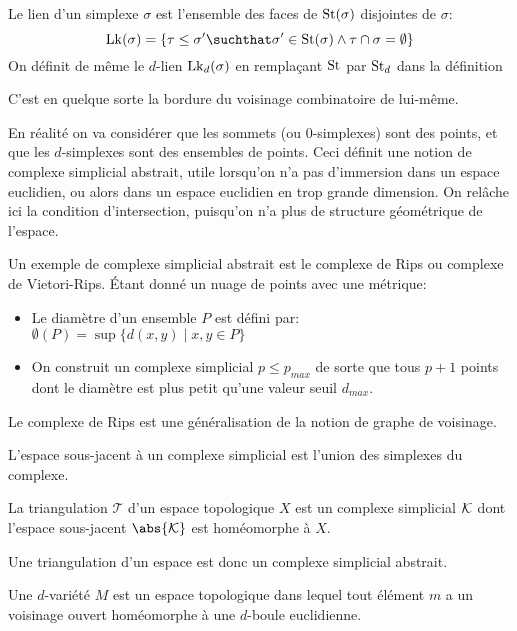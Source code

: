 \begin{definition}
	Le lien d'un simplexe $\sigma$ est l'ensemble des faces de $\operatorname{St}(\sigma)$ disjointes de $\sigma$:
	\begin{equation*}
		\Lk(\sigma) = \left\{\tau \leq \sigma' \suchthat \sigma' \in \St(\sigma) \land \tau \cap \sigma = \emptyset \right\}
	\end{equation*}
	On définit de même le $d$-lien $\operatorname{Lk}_{d}(\sigma)$ en remplaçant $\operatorname{St}$ par $\operatorname{St}_{d}$ dans la définition
\end{definition}
C'est en quelque sorte la bordure du voisinage combinatoire de lui-même.

\medskip

En réalité on va considérer que les sommets (ou $0$-simplexes) sont des points, et que les $d$-simplexes sont des ensembles de points.
Ceci définit une notion de complexe simplicial abstrait, utile lorsqu'on n'a pas d'immersion dans un espace euclidien, ou alors dans un espace euclidien en trop grande dimension.
On relâche ici la condition d'intersection, puisqu'on n'a plus de structure géométrique de l'espace.

Un exemple de complexe simplicial abstrait est le complexe de Rips ou complexe de Vietori-Rips. Étant donné un nuage de points avec une métrique:
\begin{itemize}
	\item Le diamètre d'un ensemble $P$ est défini par: $\emptyset(P) = \sup\{d(x, y) \mid x, y \in P\}$
	\item On construit un complexe simplicial $p \leq p_{max}$ de sorte que tous $p + 1$ points dont le diamètre est plus petit qu'une valeur seuil $d_{max}$.
\end{itemize}
Le complexe de Rips est une généralisation de la notion de graphe de voisinage.

\begin{definition}
	L'espace sous-jacent à un complexe simplicial est l'union des simplexes du complexe.
\end{definition}

\begin{definition}
	La triangulation $\mathcal{T}$ d'un espace topologique $X$ est un complexe simplicial $\mathcal{K}$ dont l'espace sous-jacent $\abs{\mK}$ est homéomorphe à $X$.
\end{definition}
Une triangulation d'un espace est donc un complexe simplicial abstrait.


\begin{definition}
	Une $d$-variété $M$ est un espace topologique dans lequel tout élément $m$ a un voisinage ouvert homéomorphe à une $d$-boule euclidienne.
\end{definition}

